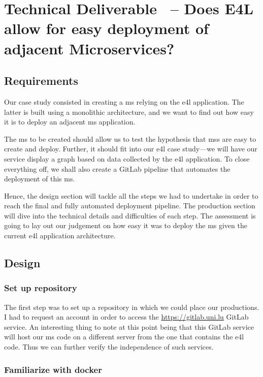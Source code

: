 \section{Technical Deliverable \thetdel\ -- Does E4L allow for easy
deployment of adjacent Microservices?}

\subsection{Requirements}

Our case study consisted in creating a \gls{ms} relying on the
\gls{e4l} application. The latter is built using a monolithic
architecture, and we want to find out how easy it is to deploy an
adjacent \gls{ms} application.

The \gls{ms} to be created should allow us to test the hypothesis that
\glspl{ms} are easy to create and deploy. Further, it should fit into
our \gls{e4l} case study---we will have our service display a graph
based on data collected by the \gls{e4l} application.  To close
everything off, we shall also create a GitLab pipeline that automates
the deployment of this \gls{ms}.

Hence, the design section will tackle all the steps we had to
undertake in order to reach the final and fully automated deployment
pipeline. The production section will dive into the technical details
and difficulties of each step. The assessment is going to lay out our
judgement on how easy it was to deploy the \gls{ms} given the current
\gls{e4l} application architecture.

\subsection{Design}

\subsubsection{Set up repository}

The first step was to set up a repository in which we could place our
productions. I had to request an account in order to access the
\url{https://gitlab.uni.lu} GitLab service. An interesting thing to
note at this point being that this GitLab service will host our
\gls{ms} code on a different server from the one that contains the
\gls{e4l} code. Thus we can further verify the independence of such
services.

\subsubsection{Familiarize with docker}

